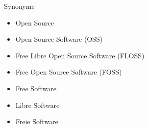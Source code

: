 



\begin{frame}
  \titlepage
\end{frame}

\begin{frame}{Synonyme}
  \begin{itemize}
  \item<1-> Open Source
  \item<4-> Open Source Software (OSS)
  \item<4-> Free Libre Open Source Software (FLOSS)
  \item<4-> Free Open Source Software (FOSS)
  \item<2-> Free Software
  \item<3-> Libre Software
  \item<5-> \color{blue}Freie Software
  \end{itemize}
\end{frame}


